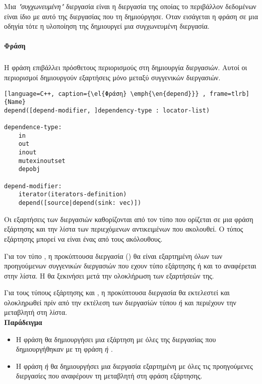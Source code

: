 Μια \emph{"συγχωνευμένη"} διεργασία είναι η διεργασία της οποίας το περιβάλλον δεδομένων είναι ίδιο με αυτό της
διεργασίας που τη δημιούργησε. Οταν εισάγεται η φράση \emph{} σε μια οδηγία \emph{} τότε η
υλοποίηση της δημιουργεί μια συγχωνευμένη διεργασία.
\paragraph{Φράση }
\subparagraph{}

Η φράση \textbf{} επιβάλλει πρόσθετους περιορισμούς στη δημιουργία διεργασιών. Αυτοί οι περιορισμοί
δημιουργούν εξαρτήσεις μόνο μεταξύ συγγενικών διεργασιών.

\begin{spacing}{1.1}
\begin{lstlisting}[language=C++, caption={\el{Φράση} \emph{\en{depend}}} , frame=tlrb]{Name}
depend([depend-modifier, ]dependency-type : locator-list)

dependence-type:
	in
	out
	inout
	mutexinoutset
	depobj	
	
depend-modifier:
	iterator(iterators-definition)
	depend([source|depend(sink: vec)])
\end{lstlisting}
\end{spacing}
\clearpage
Οι εξαρτήσεις των διεργασιών καθορίζονται από τον τύπο που ορίζεται σε μια φράση εξάρτησης και την λίστα των
περιεχόμενων αντικειμένων που ακολουθεί. Ο τύπος εξάρτησης μπορεί να είναι ένας από τους ακόλουθους\cite{oracle1}.

Για τον τύπο \textbf{}, η προκύπτουσα διεργασία () θα είναι εξαρτημένη όλων των προηγούμενων συγγενικών
διεργασιών που εχουν τύπο εξάρτησης \emph{} ή \emph{} και το \textbf{} αναφέρεται στην λίστα. Η
 θα ξεκινήσει μετά την ολοκλήρωση των εξαρτήσεών της.

Για τους τύπους εξάρτησης \emph{\textbf{}} και \emph{\textbf{}}, η προκύπτουσα διεργασία  θα
εκτελεστεί και ολοκληρωθεί πρίν από την εκτέλεση των διεργασίών τύπου \emph{ ή } και περιέχουν την
μεταβλητή \textbf{} στη λίστα. \ \\

\textbf{Παράδειγμα}
\begin{itemize}
\item{Η φράση \emph{} θα δημιουργήσει μια εξάρτηση με όλες της διεργασίας που δημιουργήθηκαν με τη
φράση \emph{ ή }}.

\item{Η φράση \emph{ ή } θα δημιουργήσει μια διεργασία εξαρτημένη με όλες τις
προηγούμενες διεργασίες που αναφέρουν τη μεταβλητή \emph{} στη φράση εξάρτησης.}
\end{itemize}

